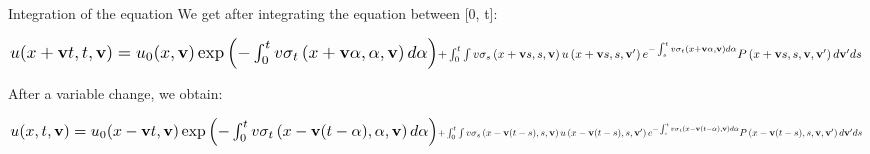 \documentclass{beamer}
\def\\{}%
\begin{document}
	\begin{frame}{Integration of the equation}
		We get after integrating the equation between [0, t]:
		
		\begin{multline*}
			\resizebox{\linewidth}{!}{$
				u(x+\textbf{v}t,t,\textbf{v}) = u_0(x, \textbf{v}) \exp\left(- \int_{0}^{t} v\sigma_t\left(x + \textbf{v} \alpha, \alpha, \textbf{v}\right) d\alpha\right)$} \\
			\resizebox{\linewidth}{!}{$
				+ \int_{0}^{t} \int v\sigma_s\left(x + \textbf{v}s, s, \textbf{v}\right) u\left(x + \textbf{v}s, s, \textbf{v}'\right) e^{- \int_s^t v\sigma_t\left(x + \textbf{v} \alpha, \textbf{v}\right) d\alpha} P\left(x + \textbf{v} s, s, \textbf{v}, \textbf{v}'\right) d\textbf{v}'ds$
			}
		\end{multline*}
		
		After a variable change, we obtain:
		
		\begin{multline*}
			\resizebox{\linewidth}{!}{$
				u(x,t,\textbf{v}) = u_0(x - \textbf{v}t, \textbf{v}) \exp\left(- \int_{0}^{t} v\sigma_t\left(x - \textbf{v}(t - \alpha), \alpha, \textbf{v}\right) d\alpha\right)$} \\
			\resizebox{\linewidth}{!}{$
				+ \int_{0}^{t} \int v\sigma_s\left(x - \textbf{v}(t - s), s, \textbf{v}\right) u\left(x - \textbf{v}(t - s), s, \textbf{v}'\right) e^{- \int_s^t v\sigma_t\left(x - \textbf{v}(t - \alpha), \textbf{v}\right) d\alpha} P\left(x - \textbf{v}(t - s), s, \textbf{v}, \textbf{v}'\right) d\textbf{v}'ds$
			}
		\end{multline*}
	\end{frame}
	
\end{document}
